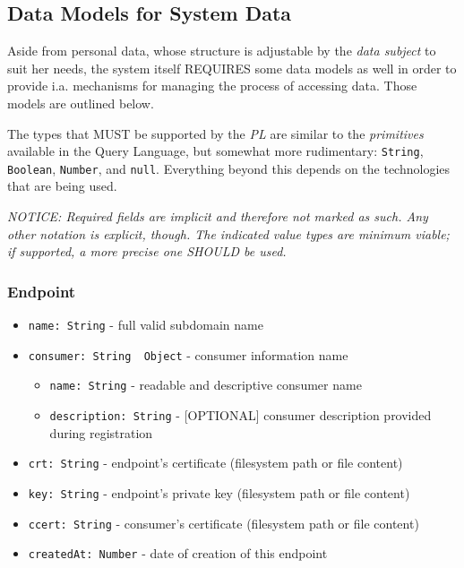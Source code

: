 \documentclass[12pt,english,a4paper,titlepage,cleardoublepage=empty,dottedtoc]{report}
\providecommand{\tightlist}{%
  \setlength{\itemsep}{0pt}\setlength{\parskip}{0pt}}
\begin{document}
\subsection{Data Models for System
Data}\label{data-models-for-system-data}

Aside from personal data, whose structure is adjustable by the
\emph{data subject} to suit her needs, the system itself REQUIRES some
data models as well in order to provide i.a. mechanisms for managing the
process of accessing data. Those models are outlined below.

The types that MUST be supported by the \emph{PL} are similar to the
\emph{primitives} available in the Query Language, but somewhat more
rudimentary: \texttt{String}, \texttt{Boolean}, \texttt{Number}, and
\texttt{null}. Everything beyond this depends on the technologies that
are being used.

\emph{NOTICE: Required fields are implicit and therefore not marked as
such. Any other notation is explicit, though. The indicated value types
are minimum viable; if supported, a more precise one SHOULD be used.}

\subsubsection{Endpoint}\label{endpoint}

\begin{itemize}
\tightlist
\item
  \texttt{name:\ String} - full valid subdomain name
\item
  \texttt{consumer:\ String\ \textbar{}\textbar{}\ Object} - consumer
  information \textbar{}\textbar{} name

  \begin{itemize}
  \tightlist
  \item
    \texttt{name:\ String} - readable and descriptive consumer name
  \item
    \texttt{description:\ String} - {[}OPTIONAL{]} consumer description
    provided during registration
  \end{itemize}
\item
  \texttt{crt:\ String} - endpoint's certificate (filesystem path or
  file content)
\item
  \texttt{key:\ String} - endpoint's private key (filesystem path or
  file content)
\item
  \texttt{ccert:\ String} - consumer's certificate (filesystem path or
  file content)
\item
  \texttt{createdAt:\ Number} - date of creation of this endpoint
\end{itemize}
\end{document}
